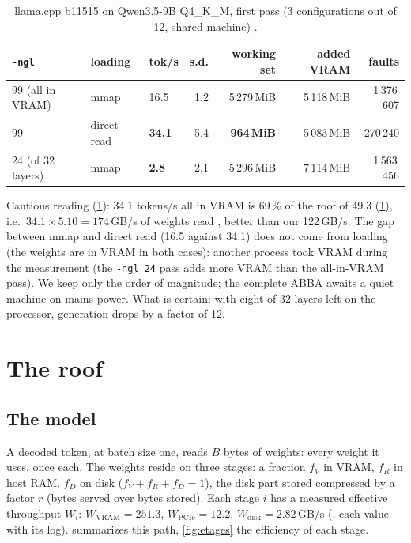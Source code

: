\begin{table}[ht]
\centering\small
\caption[llama.cpp on Qwen3.5-9B Q4\_K\_M, first pass]{llama.cpp b11515 on Qwen3.5-9B Q4\_K\_M, first pass (3 configurations out of 12, shared machine) \mes.}
\label{tab:llama-base}
\begin{tabular}{@{}lllrrrr@{}}
\toprule
\texttt{-ngl} & loading & tok/s & s.d. & working set & added VRAM & faults \\
\midrule
99 (all in VRAM) & mmap & 16.5 & 1.2 & 5\,279\,MiB & 5\,118\,MiB & 1\,376\,607 \\
99 & direct read & \textbf{34.1} & 5.4 & \textbf{964\,MiB} & 5\,083\,MiB & 270\,240 \\
24 (of 32 layers) & mmap & \textbf{2.8} & 2.1 & 5\,296\,MiB & 7\,114\,MiB & 1\,563\,456 \\
\bottomrule
\end{tabular}
\end{table}

Cautious reading (\cref{tab:llama-base}): 34.1 tokens/s all in VRAM is 69\,\% of the roof of 49.3 (\cref{sec:toit}), i.e.\ $34.1 \times 5.10 = 174$\,GB/s of weights read \calc, better than our 122\,GB/s. The gap between mmap and direct read (16.5 against 34.1) does not come from loading (the weights are in VRAM in both cases): another process took VRAM during the measurement (the \texttt{-ngl 24} pass adds more VRAM than the all-in-VRAM pass). We keep only the order of magnitude; the complete ABBA awaits a quiet machine on mains power. What is certain: with eight of 32 layers left on the processor, generation drops by a factor of 12.

\section{The roof}\label{sec:toit}

\subsection{The model}

A decoded token, at batch size one, reads $B$ bytes of weights: every weight it uses, once each. The weights reside on three stages: a fraction $f_V$ in VRAM, $f_R$ in host RAM, $f_D$ on disk ($f_V + f_R + f_D = 1$), the disk part stored compressed by a factor $r$ (bytes served over bytes stored). Each stage $i$ has a measured effective throughput $W_i$: $W_{\mathrm{VRAM}} = 251.3$, $W_{\mathrm{PCIe}} = 12.2$, $W_{\mathrm{disk}} = 2.82$\,GB/s (, each value with its log).  summarizes this path, \cref{fig:etages} the efficiency of each stage.

